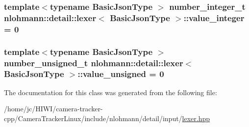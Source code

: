 \subsubsection[{\texorpdfstring{value\+\_\+integer}{value_integer}}]{\setlength{\rightskip}{0pt plus 5cm}template$<$typename Basic\+Json\+Type $>$ {\bf number\+\_\+integer\+\_\+t} {\bf nlohmann\+::detail\+::lexer}$<$ Basic\+Json\+Type $>$\+::value\+\_\+integer = 0\hspace{0.3cm}{\ttfamily [private]}}\hypertarget{classnlohmann_1_1detail_1_1lexer_a353d8eeca5b2f21b3e88540c17afb9bc}{}\label{classnlohmann_1_1detail_1_1lexer_a353d8eeca5b2f21b3e88540c17afb9bc}
\subsubsection[{\texorpdfstring{value\+\_\+unsigned}{value_unsigned}}]{\setlength{\rightskip}{0pt plus 5cm}template$<$typename Basic\+Json\+Type $>$ {\bf number\+\_\+unsigned\+\_\+t} {\bf nlohmann\+::detail\+::lexer}$<$ Basic\+Json\+Type $>$\+::value\+\_\+unsigned = 0\hspace{0.3cm}{\ttfamily [private]}}\hypertarget{classnlohmann_1_1detail_1_1lexer_af250180459c23ca71c3e10a99fb5ba3e}{}\label{classnlohmann_1_1detail_1_1lexer_af250180459c23ca71c3e10a99fb5ba3e}


The documentation for this class was generated from the following file\+:\begin{DoxyCompactItemize}
\item 
/home/jc/\+H\+I\+W\+I/camera-\/tracker-\/cpp/\+Camera\+Tracker\+Linux/include/nlohmann/detail/input/\hyperlink{lexer_8hpp}{lexer.\+hpp}\end{DoxyCompactItemize}
